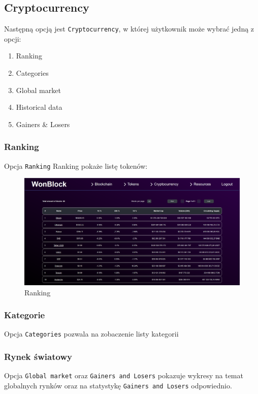 \subsection{Cryptocurrency}
Następną opcją jest \texttt{Cryptocurrency}, w której użytkownik może wybrać jedną z opcji:
\begin{enumerate}
    \item Ranking
    \item Categories
    \item Global market
    \item Historical data
    \item Gainers \& Losers
\end{enumerate}

\subsubsection{Ranking}
Opcja \texttt{Ranking} Ranking pokaże listę tokenów:
\begin{figure}[htb]
    \centering
    \includegraphics[width=0.8\linewidth]{./instrukcja/Ranking.png}
    \caption{Ranking}
    \label{fig:Ranking}
\end{figure}
\subsubsection{Kategorie}
Opcja \texttt{Categories} pozwala na zobaczenie listy kategorii
\subsubsection{Rynek światowy}
Opcja \texttt{Global market} oraz \texttt{Gainers and Losers} pokazuje wykresy na temat globalnych rynków oraz na statystykę \texttt{Gainers and Losers} odpowiednio.
